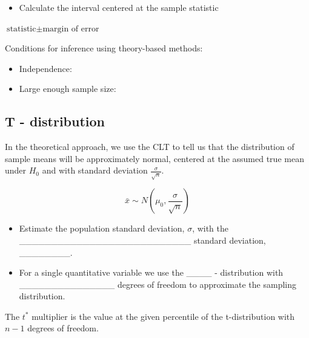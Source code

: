 \documentclass[
]{report}
\providecommand{\tightlist}{%
  \setlength{\itemsep}{0pt}\setlength{\parskip}{0pt}}
\newcommand{\rgi}{\hspace{24pt}}  %
\begin{document}
\begin{itemize}
\tightlist
\item
  Calculate the interval centered at the sample statistic
\end{itemize}

\rgi \(\text{statistic} \pm \text{margin of error}\)

\vspace{0.8in}

Conditions for inference using theory-based methods:

\begin{itemize}
\tightlist
\item
  Independence:
\end{itemize}

\vspace{0.2in}

\begin{itemize}
\tightlist
\item
  Large enough sample size:
\end{itemize}

\hypertarget{t---distribution}{%
\subsection*{T - distribution}\label{t---distribution}}

In the theoretical approach, we use the CLT to tell us that the distribution of sample means will be approximately normal, centered at the assumed true mean under \(H_0\) and with standard deviation \(\frac{\sigma}{\sqrt{n}}\).

\[\bar{x} \sim N(\mu_0, \frac{\sigma}{\sqrt{n}})\]

\begin{itemize}
\item
  Estimate the population standard deviation, \(\sigma\), with the
  \_\_\_\_\_\_\_\_\_\_\_\_\_\_\_\_\_\_\_\_\_\_\_\_\_\_\_ standard deviation, \_\_\_\_\_\_\_\_.
\item
  For a single quantitative variable we use the \_\_\_\_ - distribution
  with \_\_\_\_\_\_\_\_\_\_\_\_\_\_\_
  degrees of freedom to approximate the sampling distribution.
\end{itemize}


The \(t^*\) multiplier is the value at the given percentile of the t-distribution with \(n - 1\) degrees of freedom.
\end{document}
